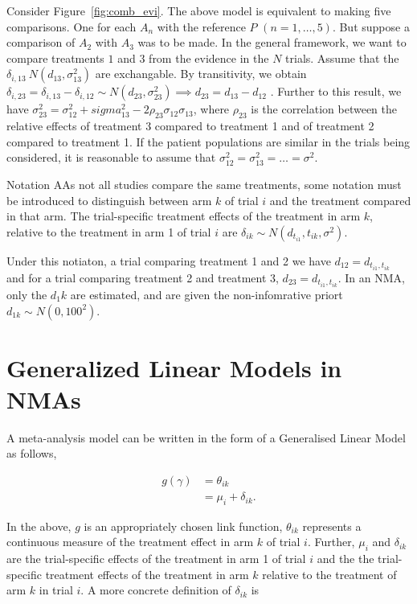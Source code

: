 Consider Figure~\ref{fig:comb_evi}. The above model is equivalent to making five comparisons. One for each $A_n$ with the reference $P$ $(n = 1,\ldots,5)$. But suppose a comparison of $A_2$ with $A_3$ was to be made. In the general framework, we want to compare treatments $1$ and $3$ from the evidence in the $N$ trials. Assume that the $\delta_{i,13} ~ N(d_{13}, \sigma^2_{13})$ are exchangable. By transitivity, we obtain $\delta_{i,23} = \delta_{i,13} - \delta_{i,12} \sim N(d_{23}, \sigma_{23}^2) \implies d_{23} = d_{13}-d_{12}$ \cite{lu2009}. Further to this result, we have $\sigma_{23}^2  = \sigma_{12}^2 + sigma_{13}^2 - 2\rho_{23}\sigma_{12}\sigma_{13}$, where $\rho_{23}$ is the correlation between the relative effects of treatment 3 compared to treatment 1 and of treatment 2 compared to treatment 1. If the patient populations are similar in the trials being considered, it is reasonable to assume that $\sigma^2_{12} = \sigma_{13}^2 = \ldots = \sigma^2$.

\begin{remark}{Notation}
    AAs not all studies compare the same treatments, some notation must be introduced to distinguish between arm $k$ of trial $i$ and the treatment compared in that arm. The trial-specific treatment effects of the treatment in arm $k$, relative to the treatment in arm 1 of trial $i$ are $\delta_{ik} \sim N(d_{t_{i1}},t_{ik}, \sigma^2)$. 
\end{remark}

Under this notiaton, a trial comparing treatment 1 and 2 we have $d_{12} = d_{t_{i1},t_{ik}}$ and for a trial comparing treatment 2 and treatment 3, $d_{23} = d_{t_{i1},t_{ik}}$. In an NMA, only the $d_1k$ are estimated, and are given the non-infomrative priort $d_{1k} \sim N(0,100^2)$.

\section{Generalized Linear Models in NMAs}
A meta-analysis model can be written in the form of a Generalised Linear Model as follows,

\begin{align}
    g(\gamma) &= \theta_{ik} \nonumber \\
              &= \mu_i + \delta_{ik}. 
    \label{nmaGLMRE}
\end{align}

In the above, $g$ is an appropriately chosen link function, $\theta_{ik}$ represents a continuous measure of the treatment effect in arm $k$ of trial $i$. Further, $\mu_i$ and $\delta_{ik}$ are the trial-specific effects of the treatment in arm 1 of trial $i$ and the the trial-specific treatment effects of the treatment in arm $k$ relative to the treatment of arm $k$ in trial $i$. A more concrete definition of $\delta_{ik}$ is 

